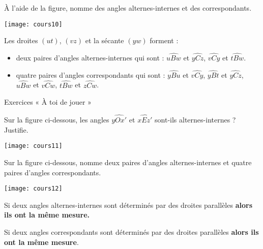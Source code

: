 \begin{exemple*1}
À l'aide de la figure, nomme des angles alternes-internes et des correspondants.

\begin{center}
    \texttt{[image: cours10]}
\end{center}

\correction
Les droites $(ut)$, $(vz)$ et la sécante $(yw)$ forment :
\begin{itemize}
    \item deux paires d'angles alternes-internes qui sont : $\widehat{uBw}$ et $\widehat{yCz}$, $\widehat{vCy}$ et $\widehat{tBw}$.
    \item quatre paires d'angles correspondants qui sont : $\widehat{yBu}$ et $\widehat{vCy}$, $\widehat{yBt}$ et $\widehat{yCz}$, $\widehat{uBw}$ et $\widehat{vCw}$, $\widehat{tBw}$ et $\widehat{zCw}$.
\end{itemize}
\end{exemple*1}

\vspace{1em}

Exercices « À toi de jouer »

Sur la figure ci-dessous, les angles $\widehat{yOx'}$ et $\widehat{xEz'}$ sont-ils alternes-internes ? Justifie.

\begin{center}
    \texttt{[image: cours11]}
\end{center}

Sur la figure  ci-dessous, nomme deux paires d'angles alternes-internes et quatre paires d'angles correspondants.

\begin{center}
    \texttt{[image: cours12]}
\end{center}

\begin{aconnaitre}
Si deux angles alternes-internes sont déterminés par des droites parallèles \textbf{alors ils ont la même mesure.}

\vspace{.5em}

Si deux angles correspondants sont déterminés par des droites parallèles \textbf{alors ils ont la même mesure}.
\end{aconnaitre}

